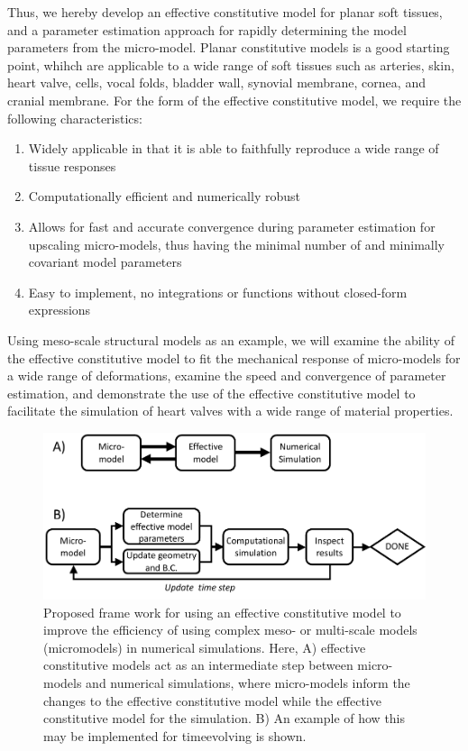     Thus, we hereby develop an effective constitutive model for planar soft tissues, and a parameter estimation approach for rapidly determining the model parameters from the micro-model. Planar constitutive models is a good starting point, whihch are applicable to a wide range of soft tissues such as arteries, skin, heart valve, cells, vocal folds, bladder wall, synovial membrane, cornea, and cranial membrane. For the form of the effective constitutive model, we require the following characteristics:
\begin{enumerate}
    \item Widely applicable in that it is able to faithfully reproduce a wide range of tissue responses
    \item Computationally efficient and numerically robust
    \item Allows for fast and accurate convergence during parameter estimation for upscaling micro-models, thus having the minimal number of and minimally covariant model parameters
    \item Easy to implement, no integrations or functions without closed-form expressions
\end{enumerate}
    Using meso-scale structural models as an example, we will examine the ability of the effective constitutive model to fit the mechanical response of micro-models for a wide range of deformations, examine the speed and convergence of parameter estimation, and demonstrate the use of the effective constitutive model to facilitate the simulation of heart valves with a wide range of material properties.
    
\begin{figure}
\centering
\includegraphics[width=\textwidth]{Images/chapter5/simulationframework}
\caption{Proposed frame work for using an effective constitutive model to improve the efficiency of using complex meso- or multi-scale models (micro\Hyphdash models) in numerical simulations. Here, A) effective constitutive models act as an intermediate step between micro-models and numerical simulations, where micro-models inform the changes to the effective constitutive model while the effective constitutive model for the simulation. B) An example of how this may be implemented for time\Hyphdash evolving is shown.}
\label{fig:simulationframework}
\end{figure}
    
    
    
    
    
    
    
    
